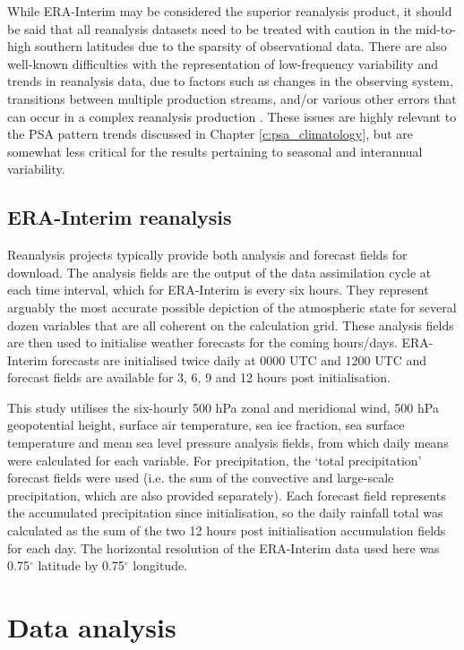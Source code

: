 While ERA-Interim may be considered the superior reanalysis product, it should be said that all reanalysis datasets need to be treated with caution in the mid-to-high southern latitudes due to the sparsity of observational data. There are also well-known difficulties with the representation of low-frequency variability and trends in reanalysis data, due to factors such as changes in the observing system, transitions between multiple production streams, and/or various other errors that can occur in a complex reanalysis production \citep{Dee2014}. These issues are highly relevant to the PSA pattern trends discussed in Chapter \ref{c:psa_climatology}, but are somewhat less critical for the results pertaining to seasonal and interannual variability.

\subsection{ERA-Interim reanalysis}

Reanalysis projects typically provide both analysis and forecast fields for download. The analysis fields are the output of the data assimilation cycle at each time interval, which for ERA-Interim is every six hours. They represent arguably the most accurate possible depiction of the atmospheric state for several dozen variables that are all coherent on the calculation grid. These analysis fields are then used to initialise weather forecasts for the coming hours/days. ERA-Interim forecasts are initialised twice daily at 0000 UTC and 1200 UTC and forecast fields are available for 3, 6, 9 and 12 hours post initialisation.  

This study utilises the six-hourly 500 hPa zonal and meridional wind, 500 hPa geopotential height, surface air temperature, sea ice fraction, sea surface temperature and mean sea level pressure analysis fields, from which daily means were calculated for each variable. For precipitation, the `total precipitation' forecast fields were used (i.e. the sum of the convective and large-scale precipitation, which are also provided separately). Each forecast field represents the accumulated precipitation since initialisation, so the daily rainfall total was calculated as the sum of the two 12 hours post initialisation accumulation fields for each day. The horizontal resolution of the ERA-Interim data used here was 0.75$^{\circ}$ latitude by 0.75$^{\circ}$ longitude. 


\section{Data analysis}

